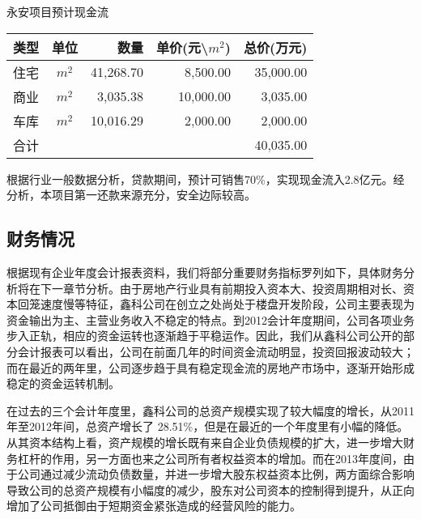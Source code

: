   \begin{center}
  \begin{threeparttable}\vspace{-1.0cm}
 \caption{永安项目预计现金流}
 \renewcommand{\arraystretch}{1.1} \arrayrulewidth=0.8pt \tabcolsep=8pt
 	 \begin{tabular}{>{\footnotesize}c>{\footnotesize}c>{\footnotesize}r>{\footnotesize}r>{\footnotesize}r}
	\hline\hline
\rowcolor{mycyan}	\bfseries 类型 	& \bfseries 单位   &  \bfseries 数量 \hspace{2ex}      & \bfseries 单价(元\textbackslash $m^2$) & \bfseries 总价(万元)  \\
	\hline \renewcommand{\arraystretch}{1}
住宅	&	$m^2$	&	41,268.70	&	8,500.00	&	35,000.00	\\
商业	&	$m^2$	&	3,035.38	&	10,000.00	&	 3,035.00	\\
车库	&	$m^2$	&	10,016.29	&	2,000.00	&	 2,000.00	\\
\midrule
合计	&		&		&		&	40,035.00	\\	
	\bottomrule
	\end{tabular}
\end{threeparttable}
\end{center}
\begin{note}
根据行业一般数据分析，贷款期间，预计可销售70\%，实现现金流入2.8亿元。经分析，本项目第一还款来源充分，安全边际较高。
\end{note}




\subsection{财务情况}
根据现有企业年度会计报表资料，我们将部分重要财务指标罗列如下，具体财务分析将在下一章节分析。由于房地产行业具有前期投入资本大、投资周期相对长、资本回笼速度慢等特征，鑫科公司在创立之处尚处于楼盘开发阶段，公司主要表现为资金输出为主、主营业务收入不稳定的特点。到2012会计年度期间，公司各项业务步入正轨，相应的资金运转也逐渐趋于平稳运作。因此，我们从鑫科公司公开的部分会计报表可以看出，公司在前面几年的时间资金流动明显，投资回报波动较大；而在最近的两年里，公司逐步趋于具有稳定现金流的房地产市场中，逐渐开始形成稳定的资金运转机制。

在过去的三个会计年度里，鑫科公司的总资产规模实现了较大幅度的增长，从2011年至2012年间，总资产增长了 28.51\%，但是在最近的一个年度里有小幅的降低。从其资本结构上看，资产规模的增长既有来自企业负债规模的扩大，进一步增大财务杠杆的作用，另一方面也来之公司所有者权益资本的增加。而在2013年度间，由于公司通过减少流动负债数量，并进一步增大股东权益资本比例，两方面综合影响导致公司的总资产规模有小幅度的减少，股东对公司资本的控制得到提升，从正向增加了公司抵御由于短期资金紧张造成的经营风险的能力。


